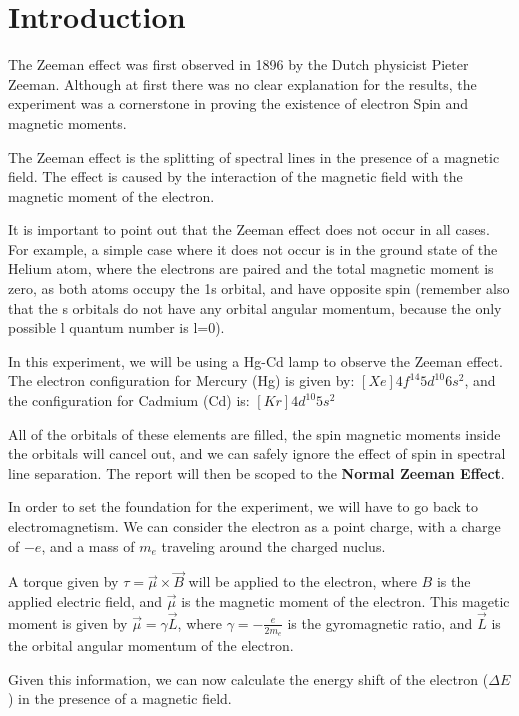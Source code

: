 \section{Introduction}

The Zeeman effect was first observed in 1896 by the Dutch physicist Pieter Zeeman. Although at first there was no clear explanation
for the results, the experiment was a cornerstone in proving the existence of electron Spin and magnetic moments.

The Zeeman effect is the splitting of spectral lines in the presence of a magnetic field. The effect is caused by the
interaction of the magnetic field with the magnetic moment of the electron.

It is important to point out that the Zeeman effect does not occur in all cases. For example, a simple case where it does not occur
is in the ground state of the Helium atom, where the electrons are paired and the total magnetic moment is zero, as both atoms occupy the 1s orbital,
and have opposite spin (remember also that the s orbitals do not have any orbital angular momentum, because the only possible l
quantum number is l=0).

In this experiment, we will be using a Hg-Cd lamp to observe the Zeeman effect. The electron configuration for Mercury (Hg) is given by: $[Xe] 4f^{14} 5d^{10} 6s^2$, and the
configuration for Cadmium (Cd) is: $[Kr] 4d^{10} 5s^2$

All of the orbitals of these elements are filled, the spin magnetic moments inside the orbitals will cancel out,
and we can safely ignore the effect of spin in spectral line separation. The report will then be scoped to the
\textbf{Normal Zeeman Effect}.

In order to set the foundation for the experiment, we will have to go back to electromagnetism.
We can consider the electron as a point charge, with a charge of $-e$, and a mass of $m_e$ traveling around the
charged nuclus.

A torque given by $\tau = \vec{\mu} \times \vec{B}$ will be applied to the electron, where  $B$ is the applied electric field, and $\vec{\mu}$ is the
magnetic moment of the electron. This magetic moment
is given by $\vec{\mu} = \gamma \vec{L}$, where $\gamma = - \frac{e}{2 m_e}$ is the gyromagnetic ratio,
and $\vec{L}$ is the orbital angular momentum of the electron.

Given this information, we can now calculate the energy shift of the electron ($\Delta E$) in the presence of a magnetic field.

